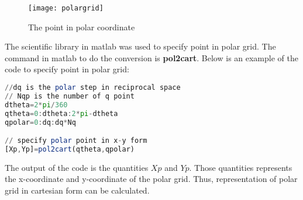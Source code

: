 \begin{figure}[ht]
  \centering
  \texttt{[image: polargrid]}
\caption{The point in polar coordinate}
\label{fig:polargrid}
\end{figure}

The scientific library in matlab was used to specify point in polar grid. The command in matlab to do the conversion is \textbf{pol2cart}. Below is an example of the code to specify point in polar grid:
\begin{lstlisting}[language=Octave]
//dq is the polar step in reciprocal space
// Nqp is the number of q point
dtheta=2*pi/360
qtheta=0:dtheta:2*pi-dtheta
qpolar=0:dq:dq*Nq          

// specify polar point in x-y form
[Xp,Yp]=pol2cart(qtheta,qpolar)  
\end{lstlisting}
The output of the code is the quantities $Xp$ and $Yp$. Those quantities represents the x-coordinate and y-coordinate of the polar grid. Thus, representation of polar grid in cartesian form can be calculated.  

